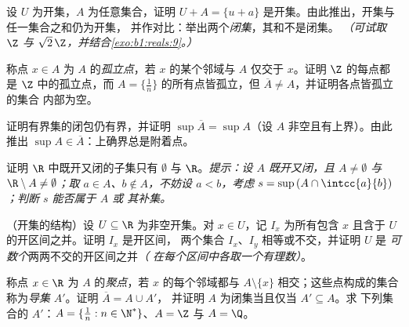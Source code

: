 \begin{exercise}[$\star\star$]\label{exo:b1:topology:6}
设 $U$ 为开集，$A$ 为任意集合，证明 $U + A = \{u + a\}$
是开集。由此推出，开集与任一集合之和仍为开集，
并作对比：举出两个\emph{闭集}，其和不是闭集。
\emph{（可试取 $\Z$ 与 $\sqrt 2\,\Z$，并结合\cref{exo:b1:reals:9}。）}
\end{exercise}

\begin{exercise}[$\star\star$]\label{exo:b1:topology:7}
称点 $x \in A$ 为 $A$ 的\emph{孤立点}，若
$x$ 的某个邻域与 $A$ 仅交于 $x$。证明 $\Z$ 的每点都是
$\Z$ 中的孤立点，而 $A = \{\frac1n\}$ 的所有点皆孤立，但
$\overline A \neq A$，并证明各点皆孤立的集合
内部为空。
\end{exercise}

\begin{exercise}[$\star\star$]\label{exo:b1:topology:8}
证明有界集的闭包仍有界，并证明
$\sup \overline A = \sup A$（设 $A$ 非空且有上界）。由此推出
$\sup A \in \overline A$：上确界总是附着点。
\end{exercise}

\begin{exercise}[$\star\star\star$]\label{exo:b1:topology:9}
证明 $\R$ 中既开又闭的子集只有
$\emptyset$ 与 $\R$。\emph{提示：设 $A$ 既开又闭，且
$A \neq \emptyset$ 与 $\R \setminus A \neq \emptyset$；取 $a \in
A$、$b \notin A$，不妨设 $a < b$，考虑 $s = \sup\,(A \cap
\intcc{a}{b})$；判断 $s$ 能否属于 $A$ 或
其补集。}
\end{exercise}

\begin{exercise}[$\star\star\star$]\label{exo:b1:topology:10}
（开集的结构）设 $U \subseteq \R$ 为非空开集。对
$x \in U$，记 $I_x$ 为所有包含
$x$ 且含于 $U$ 的开区间之并。证明 $I_x$ 是开区间，
两个集合 $I_x$、$I_y$ 相等或不交，并证明 $U$ 是
\emph{可数个}两两不交的开区间之并\emph{（
在每个区间中各取一个有理数）}。
\end{exercise}

\begin{exercise}[$\star\star$]\label{exo:b1:topology:11}
称点 $x \in \R$ 为 $A$ 的\emph{聚点}，若
$x$ 的每个邻域都与 $A \setminus \{x\}$ 相交；这些点构成的集合
称为\emph{导集} $A'$。证明 $\overline A = A \cup A'$，
并证明 $A$ 为闭集当且仅当 $A' \subseteq A$。求
下列集合的 $A'$：$A = \{\frac 1n : n \in \N^*\}$、$A = \Z$ 与
$A = \Q$。
\end{exercise}

